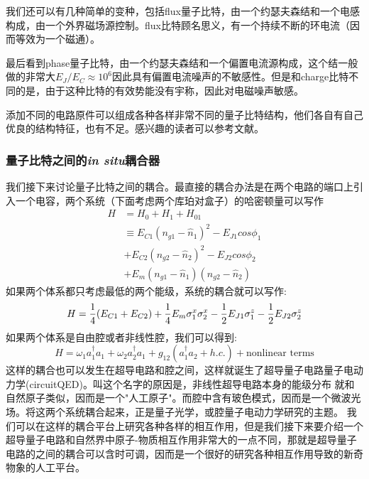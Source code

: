 \documentclass[supercite]{HustGraduPaper}
\begin{document}
      我们还可以有几种简单的变种，包括flux量子比特\cite{chiorescu2003coherent}，由一个约瑟夫森结和一个电感构成，由一个外界磁场源控制。flux比特顾名思义，有一个持续不断的环电流（因而等效为一个磁通）。
      
      
      最后看到phase量子比特\cite{lucero2012computing}，由一个约瑟夫森结和一个偏置电流源构成，这个结一般做的非常大$E_J/E_C \approx 10^6$因此具有偏置电流噪声的不敏感性。但是和charge比特不同的是，由于这种比特的有效势能没有宇称，因此对电磁噪声敏感。
      
      添加不同的电路原件可以组成各种各样非常不同的量子比特结构，他们各自有自己优良的结构特征，也有不足。感兴趣的读者可以参考文献\cite{GU20171}。
	  \subsubsection{量子比特之间的\textit{in situ}耦合器}
	  我们接下来讨论量子比特之间的耦合。最直接的耦合办法是在两个电路的端口上引入一个电容，两个系统（下面考虑两个库珀对盒子）的哈密顿量可以写作
	  \begin{equation}
		\begin{aligned}
			H &= H_0 + H_1 + H_{01}  \\
			  &\equiv E_{C1} (n_{g1} - \hat n_1)^2 - E_{J1}cos\phi_1\\
			  &+ E_{C2} (n_{g2} - \hat n_2)^2 - E_{J2}cos\phi_2\\
			  &+ E_m(n_{g1} -\hat n_1)(n_{g2}-\hat n_2)
		\end{aligned}
	  \end{equation}
	  如果两个体系都只考虑最低的两个能级，系统的耦合就可以写作:
	  \begin{equation}
		  H = \frac{1}{4}(E_{C1} + E_{C2}) + {1 \over 4} E_m \sigma^x_1 \sigma^x_2 - {1\over 2}E_{J1} \sigma^z_1 - {1\over 2}E_{J2} \sigma^z_2 
	  \end{equation}
	  如果两个体系是自由腔或者非线性腔，我们可以得到:
	  \begin{equation}
	  \label{eq:JC}
		H = \omega_1 a_1^\dagger a_1 + \omega_2 a_2^\dagger a_1 + g_{12}(a_1^\dagger a_2 + h.c.) + \text{nonlinear terms}  
	  \end{equation}
	  这样的耦合也可以发生在超导电路和腔之间，这样就诞生了超导量子电路量子电动力学(circuitQED)。叫这个名字的原因是，非线性超导电路本身的能级分布
	  就和自然原子类似，因而是一个"人工原子"。而腔中含有玻色模式，因而是一个微波光场。将这两个系统耦合起来，正是量子光学\cite{scully1999quantum}，或腔量子电动力学\cite{walther2006cavity}研究的主题。
	  我们可以在这样的耦合平台上研究各种各样的相互作用，但是我们接下来要介绍一个超导量子电路和自然界中原子-物质相互作用非常大的一点不同，那就是超导量子电路的之间的耦合可以含时可调\cite{niskanen2007quantum,chen2014qubit,blais2003tunable}，因而是一个很好的研究各种相互作用导致的新奇物象的人工平台\cite{wallraff2004strong,you2006superconducting}。
\end{document}

